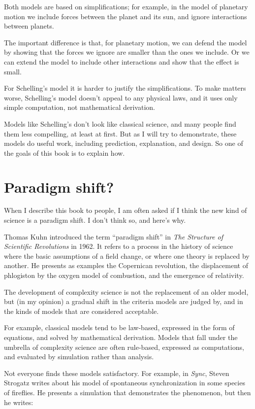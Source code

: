 \documentclass[10pt]{book}
\begin{document}
Both models are based on simplifications; for example, in the model
of planetary motion we include forces between the planet
and its sun, and ignore interactions between planets.

The important difference is that, for planetary motion, we can defend
the model by showing that the forces we ignore are smaller than the
ones we include.  Or we can extend the model to include other
interactions and show that the effect is small.

For Schelling's model it is harder to justify the simplifications.
To make matters worse, Schelling's model doesn't appeal to any
physical laws, and it uses only simple computation, not mathematical
derivation.

Models like Schelling's don't look like classical science, and many
people find them less compelling, at least at first.  But as I will
try to demonstrate, these models do useful work, including
prediction, explanation, and design.  So one of the goals of this
book is to explain how.


\section{Paradigm shift?}

When I describe this book to people, I am often asked if I think
the new kind of science is a paradigm shift.  I don't think
so, and here's why.

Thomas Kuhn introduced the term ``paradigm shift'' in {\em The
Structure of Scientific Revolutions} in 1962.  It refers to a process
in the history of science where the basic assumptions of a field
change, or where one theory is replaced by another.
He presents as examples the Copernican revolution, the displacement
of phlogiston by the oxygen model of combustion, and the emergence
of relativity.

The development of complexity science is not the replacement of
an older model, but (in my opinion) a gradual shift in the criteria
models are judged by, and in the kinds of models that are considered
acceptable.

For example, classical models tend to be law-based, expressed in the
form of equations, and solved by mathematical derivation.  Models that
fall under the umbrella of complexity science are often rule-based,
expressed as computations, and evaluated by simulation rather than
analysis.

Not everyone finds these models satisfactory.  For example, in
{\em Sync}, Steven Strogatz writes about his model of spontaneous
synchronization in some species of fireflies.  He presents a
simulation that demonstrates the phenomenon, but then he writes:
\end{document}
